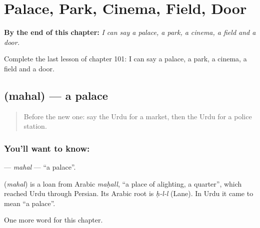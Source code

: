 
\chapter{Palace, Park, Cinema, Field, Door}
\label{ch:ur-palace-park-cinema-field-door}

\begin{chapteropening}
\textbf{By the end of this chapter:} \emph{I can say a palace, a park, a cinema, a field and a door.}

Complete the last lesson of chapter 101: I can say a palace, a park, a cinema, a field and a door.
\end{chapteropening}

\section[\texorpdfstring{\ur{محل} (mahal)}{محل (mahal)}]{ (mahal) — a palace}

\label{lesson:UR-C101-mahal}



\begin{quote}
Before the new one: say the Urdu for a market, then the Urdu for a police station.
\end{quote}

\subsection*{You'll want to know: }
\textbf{} — \emph{mahal} — \textquotedblleft{}a palace\textquotedblright{}.

\begin{cousinweb}
\textbf{} (\emph{mahal}) is a loan from Arabic \emph{maḥall}, \textquotedblleft{}a place of alighting, a quarter\textquotedblright{}, which reached Urdu through Persian. Its Arabic root is \emph{ḥ-l-l} (Lane). In Urdu it came to mean \textquotedblleft{}a palace\textquotedblright{}.
\end{cousinweb}

\begin{grammarlens}[title={What you've built}]
One more word for this chapter.
\end{grammarlens}

